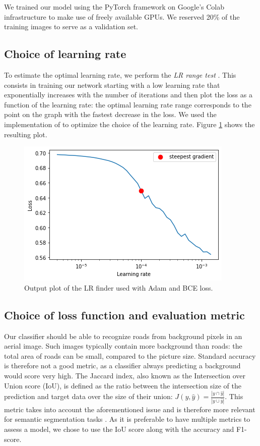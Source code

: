\documentclass[10pt,conference,compsocconf]{IEEEtran}
\begin{document}
We trained our model using the PyTorch framework \cite{pytorch} on Google's Colab infrastructure to make use of freely available GPUs. We reserved 20\% of the training images to serve as a validation set. 

\subsection{Choice of learning rate}
\label{sec:choice_lr}

To estimate the optimal learning rate, we perform the \emph{LR range test}  \cite{lr_estimation}. This consists in training our network starting with a low learning rate that exponentially increases with the number of iterations and then plot the loss as a function of the learning rate: the optimal learning rate range corresponds to the point on the graph with the fastest decrease in the loss. We used the implementation of \cite{pytorch_lr_finder} to optimize the choice of the learning rate. Figure \ref{fig:lr_finder_plot} shows the resulting plot.

\begin{figure}[ht]
    \centering
    \includegraphics[width=0.7\linewidth]{doc/images/lr_finder_plot.png}
    \caption{Output plot of the LR finder used with Adam and BCE loss.}
    \label{fig:lr_finder_plot}
\end{figure}

\subsection{Choice of loss function and evaluation metric}

Our classifier should be able to recognize roads from background pixels in an aerial image. Such images typically contain more background than roads: the total area of roads can be small, compared to the picture size. Standard accuracy is therefore not a good metric, as a classifier always predicting a background would score very high. The Jaccard index, also known as the Intersection over Union score (IoU), is defined as the ratio between the intersection size of the prediction and target data over the size of their union: $J(y, \hat{y}) = \frac{|y \cap \hat{y}|}{|y \cup \hat{y}|}$. This metric takes into account the aforementioned issue and is therefore more relevant for semantic segmentation tasks \cite{reitsam_2020}. As it is preferable to have multiple metrics to assess a model, we chose to use the IoU score along with the accuracy and F1-score. \\
\end{document}
